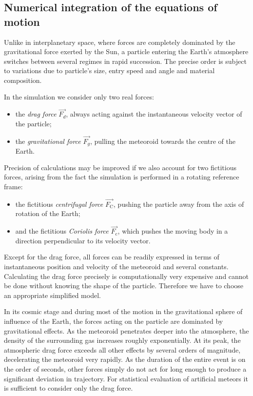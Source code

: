     \subsection{Numerical integration of the equations of motion} \label{sai}
        Unlike in interplanetary space, where forces are completely dominated by the gravitational force exerted by the Sun,
        a particle entering the Earth's atmosphere switches between several regimes in rapid succession.
        The precise order is subject to variations due to particle's size, entry speed and angle
        and material composition.

        In the simulation we consider only two real forces:
        \begin{itemize}
            \item the \emph{drag force} $\vec{F_d}$, always acting against the instantaneous velocity vector of the particle;
            \item the \emph{gravitational force} $\vec{F_g}$, pulling the meteoroid towards the centre of the Earth.
        \end{itemize}

        Precision of calculations may be improved if we also account for two fictitious forces,
        arising from the fact the simulation is performed in a rotating reference frame:
        \begin{itemize}
            \item the fictitious \emph{centrifugal force} $\vec{F_{\mathrm{C}}}$,
                pushing the particle away from the axis of rotation of the Earth;
            \item and the fictitious \emph{Coriolis force} $\vec{F_{\mathrm{c}}}$,
                which pushes the moving body in a direction perpendicular to its velocity vector.
        \end{itemize}

        Except for the drag force, all forces can be readily expressed in terms of instantaneous
        position and velocity of the meteoroid and several constants.
        Calculating the drag force precisely is computationally very expensive and cannot be done
        without knowing the shape of the particle. Therefore we have to choose an appropriate simplified model.

        In its cosmic stage and during most of the motion in the gravitational sphere of influence of the Earth,
        the forces acting on the particle are dominated by gravitational effects. As the meteoroid penetrates
        deeper into the atmosphere, the density of the surrounding gas increases roughly exponentially.
        At its peak, the atmospheric drag force exceeds all other effects by several orders of magnitude,
        decelerating the meteoroid very rapidly.
        As the duration of the entire event is on the order of seconds, other forces simply do not act for long enough
        to produce a significant deviation in trajectory. For statistical evaluation of artificial meteors
        it is sufficient to consider only the drag force.

